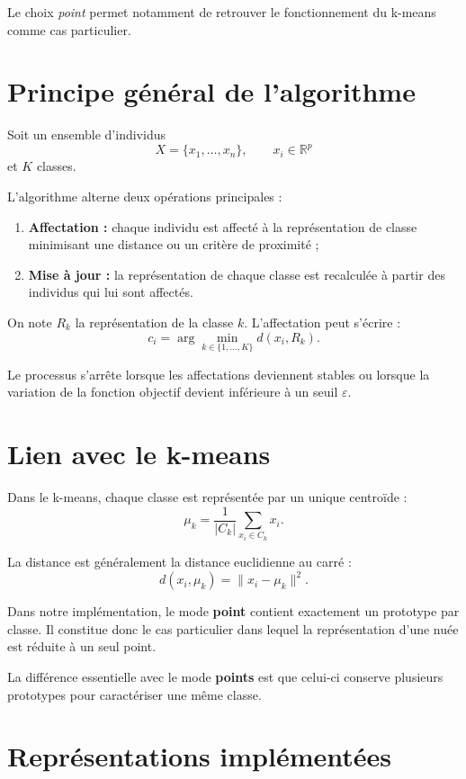 \documentclass[12pt,a4paper]{article}
\begin{document}
Le choix \textit{point} permet notamment de retrouver le fonctionnement du k-means comme cas particulier.

\section{Principe général de l'algorithme}

Soit un ensemble d'individus
\[
X = \{x_1,\ldots,x_n\}, \qquad x_i\in\mathbb{R}^p
\]
et $K$ classes.

L'algorithme alterne deux opérations principales :

\begin{enumerate}
    \item \textbf{Affectation :} chaque individu est affecté à la représentation de classe minimisant une distance ou un critère de proximité ;
    \item \textbf{Mise à jour :} la représentation de chaque classe est recalculée à partir des individus qui lui sont affectés.
\end{enumerate}

On note $R_k$ la représentation de la classe $k$. L'affectation peut s'écrire :
\[
c_i = \arg\min_{k\in\{1,\ldots,K\}} d(x_i,R_k).
\]

Le processus s'arrête lorsque les affectations deviennent stables ou lorsque la variation de la fonction objectif devient inférieure à un seuil $\varepsilon$.

\section{Lien avec le k-means}

Dans le k-means, chaque classe est représentée par un unique centroïde :
\[
\mu_k = \frac{1}{|C_k|}\sum_{x_i\in C_k}x_i.
\]

La distance est généralement la distance euclidienne au carré :
\[
d(x_i,\mu_k)=\|x_i-\mu_k\|^2.
\]

Dans notre implémentation, le mode \textbf{point} contient exactement un prototype par classe. Il constitue donc le cas particulier dans lequel la représentation d'une nuée est réduite à un seul point.

La différence essentielle avec le mode \textbf{points} est que celui-ci conserve plusieurs prototypes pour caractériser une même classe.

\section{Représentations implémentées}
\end{document}
